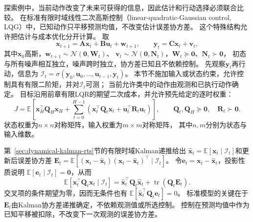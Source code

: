 探索例中，当前动作改变了未来可获得的信息，因此估计和行动选择必须联合比较。
在标准有限时域线性二次高斯控制（linear-quadratic-Gaussian control, LQG）中，已知动作只平移预测均值，不改变估计误差协方差。
这个特殊结构允许把估计与成本优化分开计算。
取
\[
  \bm x_{t+1}=\bm A\bm x_t+\bm B\bm u_t+\bm w_{t+1},
  \qquad \bm y_t=\bm C\bm x_t+\bm v_t,
\]
其中$\bm x_0$高斯，$\bm w_{t+1}\sim\mathcal N(\bm0,\bm W_t)$、
$\bm v_t\sim\mathcal N(\bm0,\bm N_t)$，$\bm W_t\succeq\bm0$、$\bm N_t\succ\bm0$，
初态与所有噪声相互独立，噪声跨时独立，协方差已知且不依赖控制。
先观察$\bm y_t$再行动，信息为
$\mathcal I_t=\sigma(\bm y_0,\bm u_0,\ldots,\bm u_{t-1},\bm y_t)$。
本节不施加输入或状态约束，允许控制具有有限二阶矩，并对$\mathcal I_t$可测；
当前允许类中的动作由观测和已执行动作确定。
目标沿用前章有限LQR的期望二次成本，并允许预先给定的逐时权重：
\[
  J=\mathbb E\left[\bm x_H^\top\bm Q_H\bm x_H
    +\sum_{t=0}^{H-1}
      (\bm x_t^\top\bm Q_t\bm x_t+\bm u_t^\top\bm R_t\bm u_t)\right],
  \qquad \bm Q_t,\bm Q_H\succeq\bm0,\quad\bm R_t\succ\bm0.
\]
状态权重为$n\times n$对称矩阵，输入权重为$m\times m$对称矩阵，
其中$n,m$分别为状态与输入维数。

第~\ref{sec:dynamical-kalman-rts}节的有限时域Kalman递推给出
$\widehat{\bm x}_t=\mathbb E[\bm x_t\mid\mathcal I_t]$和更新后误差协方差
$\bm E_t=\mathbb E[(\bm x_t-\widehat{\bm x}_t)
(\bm x_t-\widehat{\bm x}_t)^\top\mid\mathcal I_t]$。
令$\bm e_t=\bm x_t-\widehat{\bm x}_t$，投影性质说明
$\mathbb E[\bm e_t\mid\mathcal I_t]=\bm0$，从而
\[
  \mathbb E[\bm x_t^\top\bm Q_t\bm x_t\mid\mathcal I_t]
  =\widehat{\bm x}_t^\top\bm Q_t\widehat{\bm x}_t
    +\operatorname{tr}(\bm Q_t\bm E_t).
\]
交叉项的条件期望为零，因而无条件也有
$\mathbb E[\widehat{\bm x}_t^\top\bm Q_t\bm e_t]=0$。
标准模型的关键在于$\bm E_t$由Kalman协方差递推确定，不依赖观测值或所选控制。
控制在预测均值中作为已知平移被扣除，不改变下一次观测的误差协方差。

